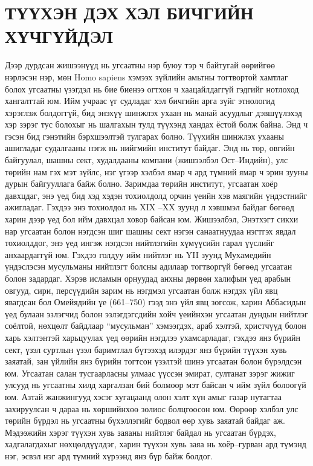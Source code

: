 \section{ТҮҮХЭН ДЭХ ХЭЛ БИЧГИЙН ХҮЧГҮЙДЭЛ}
Дээр дурдсан жишээнүүд нь угсаатны нэр буюу тэр ч байтугай өөрийгөө нэрлэсэн нэр, мөн Homo sapiens хэмээх зүйлийн амьтны тогтвортой хамтлаг болох угсаатны үзэгдэл нь бие биенээ огтхон ч хаацайлдаггүй гэдгийг нотлоход хангалттай юм. Ийм учраас үг судладаг хэл бичгийн арга зүйг этнологид хэрэглэж болдоггүй, бид энэхүү шинжлэх ухаан нь манай асуудлыг дэвшүүлэхэд хэр зэрэг тус болохыг нь шалгахын тулд түүхэнд хандах ёстой болж байна. Энд ч гэсэн бид гэнэтийн бэрхшээлтэй тулгарах болно. Түүхийн шинжлэх ухааны ашигладаг судалгааны нэгж нь нийгмийн институт байдаг. Энд нь төр, овгийн байгуулал, шашны сект, худалдааны компани (жишээлбэл Ост–Индийн), улс төрийн нам гэх мэт зүйлс, нэг үгээр хэлбэл ямар ч ард түмний ямар ч эрин зууны дурын байгууллага байж болно. Заримдаа төрийн институт, угсаатан хоёр давхцдаг, энэ үед бид хэд хэдэн тохиолдолд орчин үеийн хэв маягийн үндэстнийг ажигладаг. Гэхдээ энэ тохиолдол нь XIX –XX зуунд л хэвшмэл байдаг бөгөөд харин дээр үед бол ийм давхцал ховор байсан юм. Жишээлбэл, Энэтхэгт сикхи нар угсаатан болон нэгдсэн шиг шашны сект нэгэн санаатнуудаа нэгтгэх явдал тохиолддог, энэ үед ингэж нэгдсэн нийтлэгийн хүмүүсийн гарал үүслийг анхаардаггүй юм. Гэхдээ голдуу ийм нийтлэг нь YII зуунд Мухамедийн үндэслэсэн мусульманы нийтлэгт болсны адилаар тогтворгүй бөгөөд угсаатан болон задардаг. Хэрэв исламын орнуудад анхны дөрвөн халифын үед арабын овгууд, сири, персүүдийн зарим нь нэгдмэл угсаатан болж нэгдэх үйл явц явагдсан бол Омейядийн үе (661–750) гээд энэ үйл явц зогсож, харин Аббасидын үед булаан эзлэгчид болон эзлэгдэгсдийн хойч үеийнхэн угсаатан дундын нийтлэг соёлтой, нөхцөлт байдлаар “мусульман” хэмээгдэх, араб хэлтэй, христчүүд болон харь хэлтэнтэй харьцуулах үед өөрийн нэгдлээ ухамсарладаг, гэхдээ янз бүрийн сект, үзэл суртлын үзэл баримтлал бүтээхэд илэрдэг янз бүрийн түүхэн хувь заяатай, зан үйлийн янз бүрийн тогтсон үзэлтэй шинэ угсаатан болон бүрэлдсэн юм.
Угсаатан салан тусгаарласны улмаас үүссэн эмират, султанат зэрэг жижиг улсууд нь угсаатны хилд харгалзан бий болмоор мэт байсан ч ийм зүйл болоогүй юм. Азтай жанжингууд хэсэг хугацаанд олон хэлт хүн амыг газар нутагтаа захируулсан ч дараа нь хөршийнхөө золиос болцгоосон юм. Өөрөөр хэлбэл улс төрийн бүрдэл нь угсаатны бүхэллэгийг бодвол өөр хувь заяатай байдаг аж. Мэдээжийн хэрэг түүхэн хувь заяаны нийтлэг байдал нь угсаатан бүрдэх, хадгалагдахыг нөхцөлдүүлдэг, харин түүхэн хувь заяа нь хоёр–гурван ард түмэнд нэг, эсвэл нэг ард түмний хүрээнд янз бүр байж болдог.
